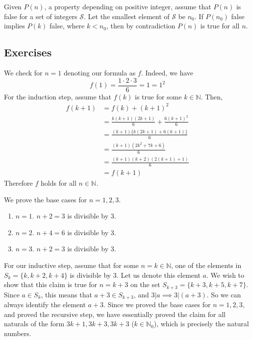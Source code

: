\documentclass{article}
\begin{document}
    \begin{theorem}
      Given $P(n)$, a property depending on positive integer, assume that $P(n)$ is false for a set of integers $\mathcal{S}$. Let the smallest element of $\mathcal{S}$ be $n_0$. If $P(n_0)$ false implies $P(k)$ false, where $k < n_0$, then by contradiction $P(n)$ is true for all $n$. 
    \end{theorem}

  \subsection{Exercises} 

    \begin{exercise}
      We check for $n = 1$ denoting our formula as $f$. Indeed, we have 
      \begin{equation}
        f(1) = \frac{1 \cdot 2 \cdot 3}{6} = 1 = 1^2
      \end{equation} 
      For the induction step, assume that $f(k)$ is true for some $k \in \mathbb{N}$. Then, 
      \begin{align}
        f(k+1) & = f(k) + (k+1)^2 \\
               & = \frac{k (k + 1) (2k + 1)}{6} + \frac{6 (k+1)^2}{6} \\
               & = \frac{(k+1) \{ k (2k+1) + 6(k+1)\}}{6} \\
               & = \frac{(k+1) (2k^2 + 7k + 6)}{6} \\
               & = \frac{(k+1)(k+2)(2(k+1) + 1)}{6} \\
               & = f(k+1)
      \end{align}
      Therefore $f$ holds for all $n \in \mathbb{N}$. 
    \end{exercise} 

    \begin{exercise}
      We prove the base cases for $n = 1, 2, 3$. 
      \begin{enumerate}
        \item $n = 1$. $n+2 = 3$ is divisible by $3$. 
        \item $n = 2$. $n+4 = 6$ is divisible by $3$. 
        \item $n = 3$. $n+2 = 3$ is divisible by $3$. 
      \end{enumerate} 
      For our inductive step, assume that for some $n = k \in \mathbb{N}$, one of the elements in $S_k = \{k, k+2, k+4\}$ is divisible by $3$. Let us denote this element $a$. We wish to show that this claim is true for $n = k+3$ on the set $S_{k+3} = \{k+3, k+5, k+7\}$. Since $a \in S_k$, this means that $a+3 \in S_{k+3}$, and $3 | a \implies 3 | (a+3)$. So we can always identify the element $a+3$. Since we proved the base cases for $n=1, 2, 3$, and proved the recursive step, we have essentially proved the claim for all naturals of the form $3k+1, 3k+3, 3k+3$ ($k \in \mathbb{N}_0$), which is precisely the natural numbers. 
    \end{exercise}
\end{document}
